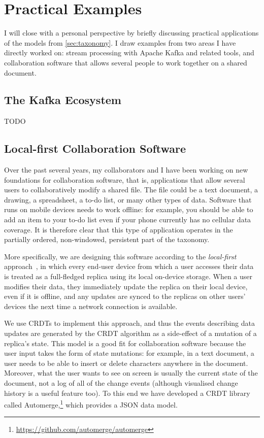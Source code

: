 \documentclass[sigconf,nonacm]{acmart}
\begin{document}
\section{Practical Examples}

I will close with a personal perspective by briefly discussing practical applications of the models from \autoref{sec:taxonomy}.
I draw examples from two areas I have directly worked on: stream processing with Apache Kafka and related tools, and collaboration software that allows several people to work together on a shared document.

\subsection{The Kafka Ecosystem}

TODO

\subsection{Local-first Collaboration Software}

Over the past several years, my collaborators and I have been working on new foundations for collaboration software, that is, applications that allow several users to collaboratively modify a shared file.
The file could be a text document, a drawing, a spreadsheet, a to-do list, or many other types of data.
Software that runs on mobile devices needs to work offline: for example, you should be able to add an item to your to-do list even if your phone currently has no cellular data coverage.
It is therefore clear that this type of application operates in the partially ordered, non-windowed, persistent part of the taxonomy.

More specifically, we are designing this software according to the \emph{local-first} approach~\cite{Kleppmann:2019}, in which every end-user device from which a user accesses their data is treated as a full-fledged replica using its local on-device storage.
When a user modifies their data, they immediately update the replica on their local device, even if it is offline, and any updates are synced to the replicas on other users' devices the next time a network connection is available.

We use CRDTs to implement this approach, and thus the events describing data updates are generated by the CRDT algorithm as a side-effect of a mutation of a replica's state.
This model is a good fit for collaboration software because the user input takes the form of state mutations: for example, in a text document, a user needs to be able to insert or delete characters anywhere in the document.
Moreover, what the user wants to see on screen is usually the current state of the document, not a log of all of the change events (although visualised change history is a useful feature too).
To this end we have developed a CRDT library called Automerge,\footnote{\url{https://github.com/automerge/automerge}} which provides a JSON data model.
\end{document}
